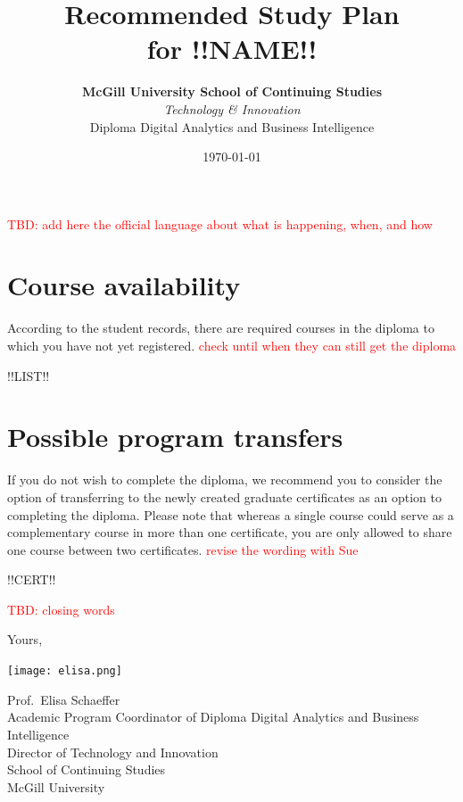 \documentclass{article}
\title{Recommended Study Plan \\ for {\bf !!NAME!!}}
\date{\today}
\author{{\bf McGill University School of Continuing Studies} \\
  {\em Technology \& Innovation} \\
  Diploma Digital Analytics and Business Intelligence}
\begin{document}
\maketitle

\thispagestyle{fancy}

\textcolor{red}{TBD: add here the official language about what is happening, when, and how}

\section*{Course availability}

According to the student records, there are required courses in the
diploma to which you have not yet registered.
\textcolor{red}{check until when they can still get the diploma}

!!LIST!!

\newpage

\section*{Possible program transfers}

If you do not wish to complete the diploma, we recommend you to
consider the option of transferring to the newly created graduate
certificates as an option to completing the diploma. Please note that
whereas a single course could serve as a complementary course in more
than one certificate, you are only allowed to share one course between
two certificates. \textcolor{red}{revise the wording with Sue}

!!CERT!!

\textcolor{red}{TBD: closing words}

Yours,

\hspace*{3mm}\texttt{[image: elisa.png]}

\vspace*{-7mm}
Prof.\ Elisa Schaeffer \\
Academic Program Coordinator of Diploma Digital Analytics and Business Intelligence \\
Director of Technology and Innovation \\
School of Continuing Studies \\
McGill University

\label{LastPage}
\end{document}
